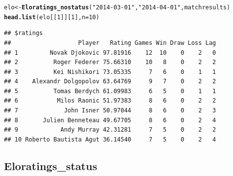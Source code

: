 \documentclass{article}\usepackage[]{graphicx}\usepackage[]{color}
\makeatletter
\newcommand{\hlnum}[1]{\textcolor[rgb]{0.686,0.059,0.569}{#1}}%
\newcommand{\hlstr}[1]{\textcolor[rgb]{0.192,0.494,0.8}{#1}}%
\newcommand{\hlstd}[1]{\textcolor[rgb]{0.345,0.345,0.345}{#1}}%
\newcommand{\hlkwb}[1]{\textcolor[rgb]{0.69,0.353,0.396}{#1}}%
\newcommand{\hlkwc}[1]{\textcolor[rgb]{0.333,0.667,0.333}{#1}}%
\newcommand{\hlkwd}[1]{\textcolor[rgb]{0.737,0.353,0.396}{\textbf{#1}}}%
\newenvironment{kframe}{%
 \def\at@end@of@kframe{}%
 \ifinner\ifhmode%
  \def\at@end@of@kframe{\end{minipage}}%
  \begin{minipage}{\columnwidth}%
 \fi\fi%
 \def\FrameCommand##1{\hskip\@totalleftmargin \hskip-\fboxsep
 \colorbox{shadecolor}{##1}\hskip-\fboxsep
     \hskip-\linewidth \hskip-\@totalleftmargin \hskip\columnwidth}%
 \MakeFramed {\advance\hsize-\width
   \@totalleftmargin\z@ \linewidth\hsize
   \@setminipage}}%
 {\par\unskip\endMakeFramed%
 \at@end@of@kframe}
\newenvironment{knitrout}{}{} %
\numberwithin{equation}{section} %
\makeatother
\begin{document}
\begin{knitrout}
\color{fgcolor}\begin{kframe}
\begin{alltt}
\hlstd{elo} \hlkwb{<-} \hlkwd{Eloratings_nostatus}\hlstd{(}\hlstr{"2014-03-01"}\hlstd{,}\hlstr{"2014-04-01"}\hlstd{,matchresults)}
\hlkwd{head.list}\hlstd{(elo[[}\hlnum{1}\hlstd{]][}\hlnum{1}\hlstd{] ,}\hlkwc{n}\hlstd{=}\hlnum{10}\hlstd{)}
\end{alltt}
\begin{verbatim}
## $ratings
##                   Player   Rating Games Win Draw Loss Lag
## 1         Novak Djokovic 97.81916    12  10    0    2   0
## 2          Roger Federer 75.66310    10   8    0    2   2
## 3          Kei Nishikori 73.05335     7   6    0    1   1
## 4    Alexandr Dolgopolov 63.64769     9   7    0    2   2
## 5          Tomas Berdych 61.09983     6   5    0    1   1
## 6           Milos Raonic 51.97383     8   6    0    2   2
## 7             John Isner 50.97044     8   6    0    2   3
## 8       Julien Benneteau 49.67705     8   6    0    2   4
## 9            Andy Murray 42.31281     7   5    0    2   2
## 10 Roberto Bautista Agut 36.14540     7   5    0    2   4
\end{verbatim}
\end{kframe}
\end{knitrout}

\subsection{Eloratings\_status}
\end{document}
